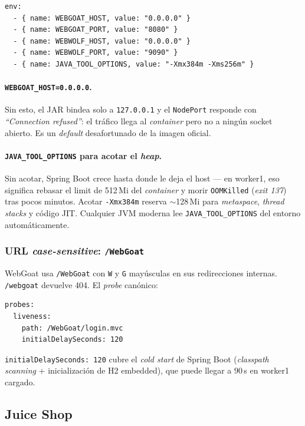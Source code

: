 \begin{lstlisting}[style=yaml]
env:
  - { name: WEBGOAT_HOST, value: "0.0.0.0" }
  - { name: WEBGOAT_PORT, value: "8080" }
  - { name: WEBWOLF_HOST, value: "0.0.0.0" }
  - { name: WEBWOLF_PORT, value: "9090" }
  - { name: JAVA_TOOL_OPTIONS, value: "-Xmx384m -Xms256m" }
\end{lstlisting}

\paragraph{\texttt{WEBGOAT\_HOST=0.0.0.0}.} Sin esto, el JAR bindea solo a \texttt{127.0.0.1} y el \texttt{NodePort} responde con \emph{``Connection refused''}: el tráfico llega al \emph{container} pero no a ningún socket abierto. Es un \emph{default} desafortunado de la imagen oficial.

\paragraph{\texttt{JAVA\_TOOL\_OPTIONS} para acotar el \emph{heap}.} Sin acotar, Spring Boot crece hasta donde le deja el host --- en worker1, eso significa rebasar el limit de 512\,Mi del \emph{container} y morir \texttt{OOMKilled} (\emph{exit 137}) tras pocos minutos. Acotar \texttt{-Xmx384m} reserva $\sim$128\,Mi para \emph{metaspace}, \emph{thread stacks} y código JIT. Cualquier JVM moderna lee \texttt{JAVA\_TOOL\_OPTIONS} del entorno automáticamente.

\subsubsection{URL \emph{case-sensitive}: \texttt{/WebGoat}}

WebGoat usa \texttt{/WebGoat} con \texttt{W} y \texttt{G} mayúsculas en sus redirecciones internas. \texttt{/webgoat} devuelve 404. El \emph{probe} canónico:

\begin{lstlisting}[style=yaml]
probes:
  liveness:
    path: /WebGoat/login.mvc
    initialDelaySeconds: 120
\end{lstlisting}

\texttt{initialDelaySeconds: 120} cubre el \emph{cold start} de Spring Boot (\emph{classpath scanning} + inicialización de H2 embedded), que puede llegar a 90\,s en worker1 cargado.

\subsection{Juice Shop}

